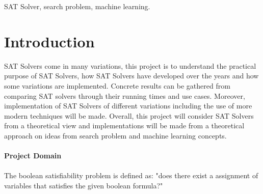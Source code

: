\documentclass[12pt,a4paper]{article}
\begin{document}
\begin{keywords}
SAT Solver, search problem, machine learning.
\end{keywords}
\newpage
\section{Introduction}

SAT Solvers come in many variations, this project is to understand the practical purpose of SAT Solvers, how SAT Solvers have developed over the years and how some variations are implemented. Concrete results can be gathered from comparing SAT solvers through their running times and use cases. Moreover, implementation of SAT Solvers of different variations including the use of more modern techniques will be made. Overall, this project will consider SAT Solvers from a theoretical view and implementations will be made from a theoretical approach on ideas from search problem and machine learning concepts.\\\\
{\bf Project Domain}\\\\
The boolean satisfiability problem is defined as: "does there exist a assignment of variables that satisfies the given boolean formula?" \\
\end{document}
